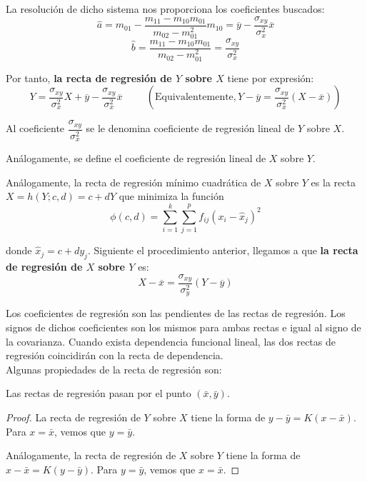 La resolución de dicho sistema nos proporciona los coeficientes buscados:
$$\hat a = m_{01} - \dfrac{m_{11} - m_{10}m_{01}}{m_{02}-m_{01}^2}m_{10} = \overline{y} - \dfrac{\sigma_{xy}}{\sigma_x^2}\overline{x}$$
$$\hat b = \dfrac{m_{11} - m_{10}m_{01}}{m_{02}- m_{01}^2} = \dfrac{\sigma_{xy}}{\sigma_x^2}$$

Por tanto, \textbf{la recta de regresión de $Y$ sobre $X$} tiene por expresión:
\begin{equation*}
    Y = \dfrac{\sigma_{xy}}{\sigma_x^2}X + \overline{y} - \dfrac{\sigma_{xy}}{\sigma_x^2}\overline{x}
    \hspace{1cm}
    \left(\text{Equivalentemente}, Y - \overline{y} = \dfrac{\sigma_{xy}}{\sigma_x^2} (X - \overline{x})\right)
\end{equation*}


\begin{definicion}
    Al coeficiente $\dfrac{\sigma_{xy}}{\sigma_x^2}$ se le denomina coeficiente de regresión lineal de $Y$ sobre $X$.

    Análogamente, se define el coeficiente de regresión lineal de $X$ sobre $Y$.
\end{definicion}


Análogamente, la recta de regresión mínimo cuadrática de $X$ sobre $Y$ es la recta $X = h(Y; c, d) = c+dY$ que minimiza
la función
$$\phi(c,d) = \sum_{i=1}^k \sum_{j=1}^p f_{ij} (x_i - \hat x_j )^2$$

donde $\hat x_j = c+dy_j$. Siguiente el procedimiento anterior, llegamos a que \textbf{la recta de regresión de $X$ sobre $Y$} es:
$$X - \overline{x} = \dfrac{\sigma_{xy}}{\sigma_y^2} (Y - \overline{y})$$


Los coeficientes de regresión son las pendientes de las rectas de regresión. Los signos de dichos coeficientes son
los mismos para ambas rectas e igual al signo de la covarianza. Cuando exista dependencia funcional lineal, las dos
rectas de regresión coincidirán con la recta de dependencia.\\

Algunas propiedades de la recta de regresión son:
\begin{lema}
    Las rectas de regresión pasan por el punto $(\bar{x}, \bar{y})$.
\end{lema}
\begin{proof}
    La recta de regresión de $Y$ sobre $X$ tiene la forma de $y-\bar{y} = K(x-\bar{x})$. Para $x=\bar{x}$, vemos que $y=\bar{y}$.

    Análogamente, la recta de regresión de $X$ sobre $Y$ tiene la forma de $x-\bar{x} = K(y-\bar{y})$. Para $y=\bar{y}$, vemos que $x=\bar{x}$.
\end{proof}

